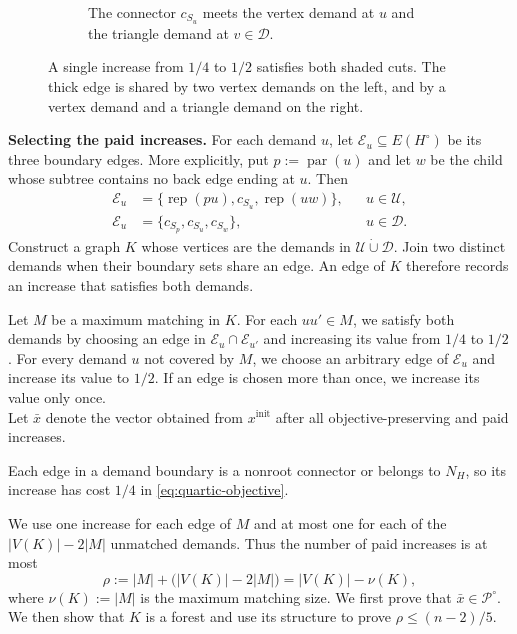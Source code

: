 \documentclass[11pt]{amsart}
\newcommand{\rep}[1]{\operatorname{rep}(#1)}
\newcommand{\1}{\mathbbm{1}}
\begin{document}
\begin{figure}[H]
\begin{subfigure}[t]{.49\textwidth}
\caption{The connector $c_{S_u}$ meets the vertex demand at $u$ and the triangle demand at $v\in\mathcal D$.}
\end{subfigure}
\caption{A single increase from $1/4$ to $1/2$ satisfies both shaded
cuts. The thick edge is shared by two vertex demands on the left,
and by a vertex demand and a triangle demand on the right.}
\label{fig:demand-shared-repairs}
\end{figure}

\textbf{Selecting the paid increases.}
For each demand $u$, let $\mathcal E_u\subseteq E(H^\circ)$
be its three boundary edges.
More explicitly, put $p:=\operatorname{par}(u)$ and let $w$ be the
child whose subtree contains no back edge ending at $u$. Then
\[
\begin{aligned}
 \mathcal E_u&=\{\rep{pu},c_{S_u},\rep{uw}\},
     &&u\in\mathcal U,\\
 \mathcal E_u&=\{c_{S_p},c_{S_u},c_{S_w}\},
     &&u\in\mathcal D.
\end{aligned}
\]
Construct a graph $K$ whose vertices are the demands in
$\mathcal U\mathbin{\dot\cup}\mathcal D$.
Join two distinct demands when their boundary sets share an edge.
An edge of $K$ therefore records an increase that satisfies both demands.

Let $M$ be a maximum matching in $K$. For each $uu'\in M$,
we satisfy both demands by choosing an edge in
$\mathcal E_u\cap\mathcal E_{u'}$ and increasing its value
from $1/4$ to $1/2$. For every demand $u$ not covered by
$M$, we choose an arbitrary edge of $\mathcal E_u$ and increase
its value to $1/2$. If an edge is chosen more than once,
we increase its value only once. \\
Let $\bar x$ denote
the vector obtained from $x^{\mathrm{init}}$ after all
objective-preserving and paid increases.

Each edge in a demand boundary is a nonroot connector or belongs
to $N_H$, so its increase has cost $1/4$ in
\eqref{eq:quartic-objective}.

We use one increase for each edge of $M$ and at most one
for each of the $|V(K)|-2|M|$ unmatched demands.
Thus the number of paid increases is at most
\begin{equation}
\label{eq:quartic-repair-number}
 \rho:=|M|+\bigl(|V(K)|-2|M|\bigr)
      =|V(K)|-\nu(K),
\end{equation}
where $\nu(K):=|M|$ is the maximum matching size.
We first prove that $\bar x\in{\mathcal P^\circ}$.
We then show that $K$ is a forest and use its structure
to prove $\rho\le(n-2)/5$.
\end{document}
